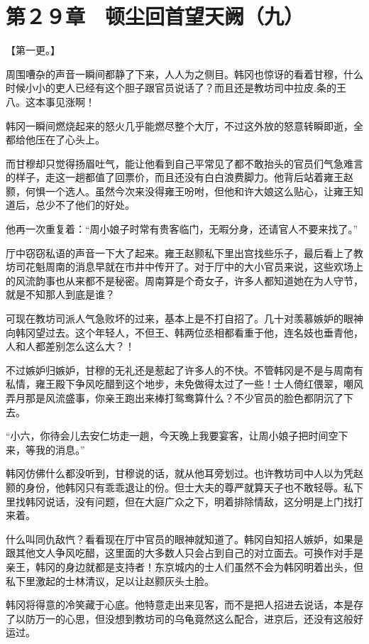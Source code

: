 \section{第２９章　顿尘回首望天阙（九）}

【第一更。】

周围嘈杂的声音一瞬间都静了下来，人人为之侧目。韩冈也惊讶的看着甘穆，什么时候小小的吏人已经有这个胆子跟官员说话了？而且还是教坊司中拉皮.条的王八。这本事见涨啊！

韩冈一瞬间燃烧起来的怒火几乎能燃尽整个大厅，不过这外放的怒意转瞬即逝，全都给他压在了心头上。

而甘穆却只觉得扬眉吐气，能让他看到自己平常见了都不敢抬头的官员们气急难言的样子，走这一趟都值了回票价，而且还没有白白浪费脚力。他背后站着雍王赵颢，何惧一个选人。虽然今次来没得雍王吩咐，但他和许大娘这么贴心，让雍王知道后，总少不了他们的好处。

他再一次重复着：“周小娘子时常有贵客临门，无暇分身，还请官人不要来找了。”

厅中窃窃私语的声音一下大了起来。雍王赵颢私下里出宫找些乐子，最后看上了教坊司花魁周南的消息早就在市井中传开了。对于厅中的大小官员来说，这些欢场上的风流韵事也从来都不是秘密。周南算是个奇女子，许多人都知道她在为人守节，就是不知那人到底是谁？

可现在教坊司派人气急败坏的过来，基本上是不打自招了。几十对羡慕嫉妒的眼神向韩冈望过去。这个年轻人，不但王、韩两位丞相都看重于他，连名妓也垂青他，人和人都差别怎么这么大？！

不过嫉妒归嫉妒，甘穆的无礼还是惹起了许多人的不快。不管韩冈是不是与周南有私情，雍王殿下争风吃醋到这个地步，未免做得太过了一些！士人倚红偎翠，嘲风弄月那是风流盛事，你亲王跑出来棒打鸳鸯算什么？不少官员的脸色都阴沉了下去。

“小六，你待会儿去安仁坊走一趟，今天晚上我要宴客，让周小娘子把时间空下来，等我的消息。”

韩冈仿佛什么都没听到，甘穆说的话，就从他耳旁划过。也许教坊司中人以为凭赵颢的身份，他韩冈只有乖乖退让的份。但士大夫的尊严就算天子也不敢轻辱。私下里找韩冈说话，没有问题，但在大庭广众之下，明着排除情敌，这分明是上门找打来着。

什么叫同仇敌忾？看看现在厅中官员的眼神就知道了。韩冈自知招人嫉妒，如果是跟其他文人争风吃醋，这里面的大多数人只会占到自己的对立面去。可换作对手是亲王，韩冈的身边就都是支持者！东京城内的士人们虽然不会为韩冈明着出头，但私下里激起的士林清议，足以让赵颢灰头土脸。

韩冈将得意的冷笑藏于心底。他特意走出来见客，而不是把人招进去说话，本是存了以防万一的心思，但没想到教坊司的乌龟竟然这么配合，进京后，还没有这般好运过。

